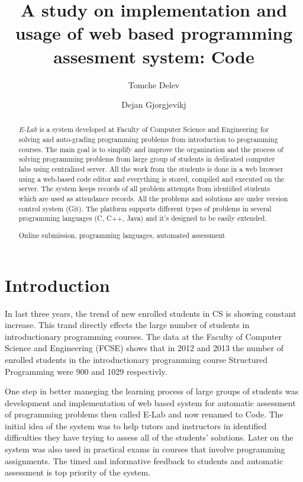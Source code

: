 \documentclass{llncs}
\newcommand{\keywords}[1]{\par\addvspace\baselineskip
\noindent\keywordname\enspace\ignorespaces#1}
\begin{document}
\title{A study on implementation and usage of web based programming assesment
system: Code}

\author{Tomche Delev \and Dejan Gjorgjevikj}



\maketitle


\begin{abstract}
\emph{E-Lab} is a system developed at Faculty of Computer Science and
Engineering for solving and auto-grading programming problems from introduction
to programming courses. The main goal is to simplify and improve the
organization and the process of solving programming problems from large group of
students in dedicated computer labs using centralized server. All the work from
the students is done in a web browser using a web-based code editor and
everything is stored, compiled and executed on the server. The system 
keeps records of all problem attempts from identified students which are used as
attendance records. All the problems and solutions are under version control
system (Git). The platform supports different types of problems in several
programming languages (C, C++, Java) and it's designed to be easily extended.

\keywords{Online submission, programming languages, automated assessment}
\end{abstract}

\section{Introduction}

In last three years, the trend of new enrolled students in CS is showing
constant increase. This trand directly effects the large number of students in
introductionary programming courses. The data at the Faculty of Computer Science
and Engineering (FCSE) shows that in 2012 and 2013 the number of enrolled
students in the introductionary programming course Structured Programming were 900 and
1029 respectivly.

One step in better maneging the learning process of large groups of students
was development and implementation of web based system for automatic assessment of programming
problems then called E-Lab \cite{delev2012lab} and now renamed to Code. The
initial idea of the system was to help tutors and instructors in identified
difficulties they have trying to assess all of the students' solutions.
Later on the system was also used in practical exams in courses that involve
programming assignments. The timed and informative feedback to students and
automatic assessment is top priority of the system.
\end{document}
